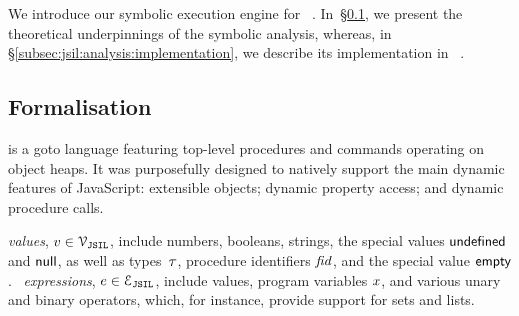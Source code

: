 
% 
% 

We introduce our symbolic execution engine for \jsil~\cite{javert}. In~\S\ref{subsec:jsil:analysis:formalism}, we present 
the theoretical underpinnings of the symbolic analysis, whereas, in \S\ref{subsec:jsil:analysis:implementation}, 
we describe its implementation in \rosette~\cite{Rosette1,Rosette2}.

\vspace*{-0.2cm}
\subsection{Formalisation}\label{subsec:jsil:analysis:formalism}

\vspace*{-0.2cm}
 \jsil is a goto language featuring top-level procedures and commands operating on object heaps. It was purposefully designed to natively support the main dynamic features of JavaScript: extensible objects; dynamic property access; and dynamic procedure calls. 

\jsil \emph{values}, $v \in \mathcal{V}_{\mathtt{JSIL}}$, include numbers, booleans, strings, the special values ${{\sf undefined}}$ and ${\sf null}$, as well as types~$\tau$, procedure identifiers $\mathit{fid}$, and the special value ${\sf empty}$. 
\jsil~\emph{expressions}, $e \in \mathcal{E}_{\mathtt{JSIL}}$, include \jsil values, \jsil program variables $x$, and various unary and binary operators, which, for instance, provide support for sets and lists. 



